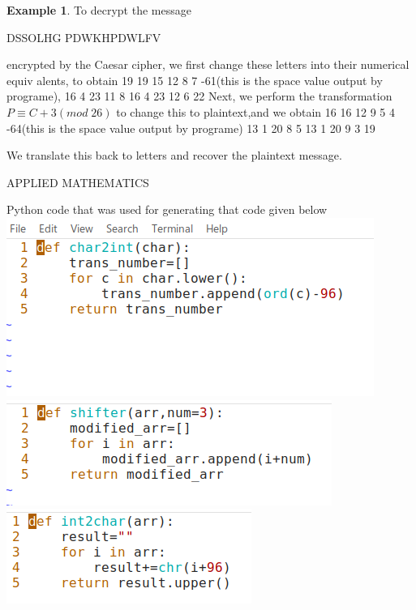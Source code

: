 \documentclass{report}
\theoremstyle{definition}
\newtheorem{exmp}{Example}[section]
\begin{document}
{{{\begin{exmp}
To decrypt the message
\begin{center}
\LARGE{DSSOLHG PDWKHPDWLFV}
\end{center}
encrypted by the Caesar cipher, we first change these letters into their numerical equiv­
alents, to obtain   19  19  15  12  8  7  -61(this is the space value output by programe), 16  4  23  11  8  16  4  23 12 6 22 \newline
Next, we perform the transformation  $P\equiv C+3 (mod \;26)$ to change this to plaintext,and we obtain  16 16 12 9 5 4 -64(this is the space value output by programe) 13 1 20 8 5 13 1 20 9 3 19\newline

We translate this back to letters and recover the plaintext message.\newline
\begin{center}
\LARGE{APPLIED MATHEMATICS} 
\end{center}

\end{exmp}

Python code that was used for generating that code given below\newline
\includegraphics[scale=.8]{1stcode}\newline
\includegraphics[scale=.8]{2ndcode}\newline
\includegraphics[scale=.8]{3rdcode}\newline




}}}
\end{document}
